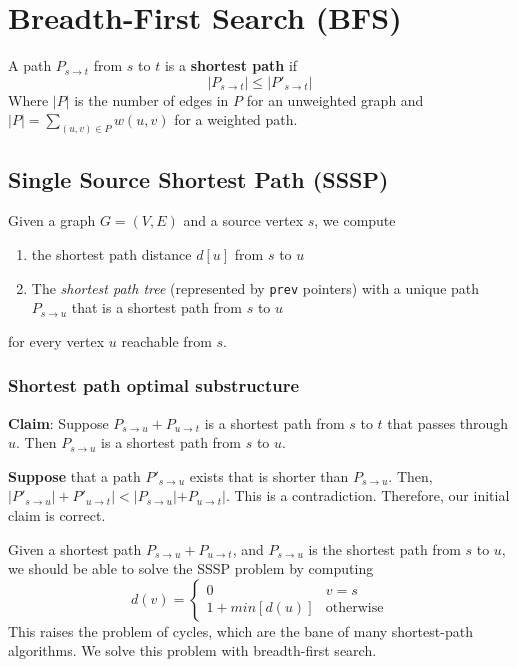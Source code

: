 \documentclass[titlepage, 12pt, leqno]{article}
\begin{document}
\pagebreak
\section{Breadth-First Search (BFS)}
\begin{definition}
    A path $P_{s\rightarrow t}$ from $s$ to $t$ is a \textbf{shortest path} if
    \[
    |P_{s\rightarrow t}| \le |P'_{s\rightarrow t}|
    \]
    Where $|P|$ is the number of edges in $P$ for an unweighted graph and
    $|P| = \sum_{(u,v) \in P}w(u,v)$ for a weighted path.
\end{definition}

\subsection{Single Source Shortest Path (SSSP)}
Given a graph $G = (V,E)$ and a source vertex $s$, we compute
\begin{enumerate}
    \item the shortest path distance $d[u]$ from $s$ to $u$
    \item The \textit{shortest path tree} (represented by \texttt{prev} 
        pointers) with a unique path $P_{s\rightarrow u}$ that is a shortest
        path from $s$ to $u$
\end{enumerate}
for every vertex $u$ reachable from $s$.

\subsubsection{Shortest path optimal substructure}
\textbf{Claim}: Suppose $P_{s\rightarrow u} + P_{u\rightarrow t}$ is a shortest
path from $s$ to $t$ that passes through $u$. Then $P_{s \rightarrow u}$ is a
shortest path from $s$ to $u$.

\textbf{Suppose} that a path $P'_{s\rightarrow u}$ exists that is shorter than
$P_{s\rightarrow u}$. Then, $|P'_{s\rightarrow u}| + P'_{u\rightarrow t}| <
|P_{s\rightarrow u}| + P_{u\rightarrow t}|$. This is a contradiction. Therefore,
our initial claim is correct.

Given a shortest path $P_{s\rightarrow u} + P_{u\rightarrow t}$, and 
$P_{s\rightarrow u}$ is the shortest path from $s$ to $u$, we should be able to
solve the SSSP problem by computing
\[
d(v) =
\begin{cases}
    0 & v=s \\
    1 + min[d(u)] & \text{otherwise}
\end{cases}
\]
This raises the problem of cycles, which are the bane of many shortest-path 
algorithms. We solve this problem with breadth-first search.
\end{document}
